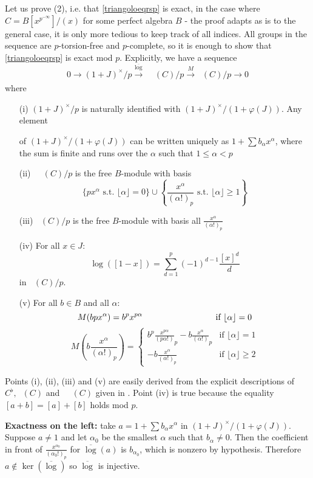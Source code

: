 \documentclass[11pt]{article}
\theoremstyle{plain}
\theoremstyle{definition}
\theoremstyle{remark}
\numberwithin{equation}{section}
\newcommand\pmeninf{p^{-\infty}}
\newcommand\xto[2]{\xrightarrow[#1]{#2}}
\DeclareMathOperator{\Acr}{\mathbb{A}_{cris}}                            %
\newcommand\perf[1]{#1^{\flat}}                                          %
\DeclareMathOperator{\Nyg}{F_N^1}                                      %
\begin{document}
Let us prove (2), i.e. that \eqref{triangoloeqrsp} is exact, in the case where $C=B[x^{\pmeninf}]/(x)$ for some perfect algebra $B$ - the proof adapts as is to the general case, it is only more tedious to keep track of all indices. All groups in the sequence are $p$-torsion-free and $p$-complete, so it is enough to show that \eqref{triangoloeqrsp} is exact mod $p$. Explicitly, we have a sequence
\begin{equation}\label{triangolomodp}
    0\to(1+J)^\times/p\xto{}{\overline{\log}}\Nyg\Acr(C)/p\xto{}{M}\Acr(C)/p\to0
\end{equation}
where
\begin{enumerate}
    \item[(i)] $(1+J)^\times/p$ is naturally identified with $(1+J)^{\times}/(1+\varphi(J))$. Any element
    \item[] of $(1+J)^{\times}/(1+\varphi(J))$ can be written uniquely as $1+\sum b_{\alpha}x^{\alpha}$, where the sum is finite and runs over the $\alpha$ such that $1\le\alpha<p$
    \item[(ii)] $\Nyg\Acr(C)/p$ is the free $B$-module with basis
    $$\{px^{\alpha}\text{ s.t. }\lfloor\alpha\rfloor=0\}\cup\left\{\frac{x^{\alpha}}{(\alpha!)_p}\text{ s.t. }\lfloor\alpha\rfloor\ge1\right\}$$
    \item[(iii)] $\Acr(C)/p$ is the free $B$-module with basis all $\frac{x^{\alpha}}{(\alpha!)_p}$
    \item[(iv)] For all $x\in J$:
    $$\log([1-x])=\sum_{d=1}^p(-1)^{d-1}\frac{[x]^d}{d}$$
    in $\Acr(C)/p$.
    \item[(v)] For all $b\in B$ and all $\alpha$:
    $$M(bpx^{\alpha})=b^px^{p\alpha}\hspace{3.05cm}\text{if }\lfloor\alpha\rfloor=0$$
    $$M\left(b\frac{x^{\alpha}}{(\alpha!)_p}\right)=\begin{cases}
        b^p\frac{x^{p\alpha}}{(p\alpha!)}_p-b\frac{x^{\alpha}}{(\alpha!)}_p&\text{if }{\lfloor\alpha\rfloor}=1\\
        -b\frac{x^{\alpha}}{(\alpha!)_p}&\text{if }{\lfloor\alpha\rfloor\ge2}
    \end{cases}$$
\end{enumerate}
Points (i), (ii), (iii) and (v) are easily derived from the explicit descriptions of $\perf{C},\Acr(C)$ and $\Nyg\Acr(C)$ given in . Point (iv) is true because the equality $[a+b]=[a]+[b]$ holds mod $p$.

\textbf{Exactness on the left:} take $a=1+\sum b_{\alpha}x^{\alpha}$ in $(1+J)^{\times}/(1+\varphi(J))$. Suppose $a\ne1$ and let $\alpha_0$ be the smallest $\alpha$ such that $b_{\alpha}\ne0$. Then the coefficient in front of $\frac{x^{\alpha_0}}{(\alpha_0!)_p}$ for $\overline{\log}(a)$ is $b_{\alpha_0}$, which is nonzero by hypothesis. Therefore $a\notin\ker(\overline{\log})$ so $\overline{\log}$ is injective.
\end{document}
